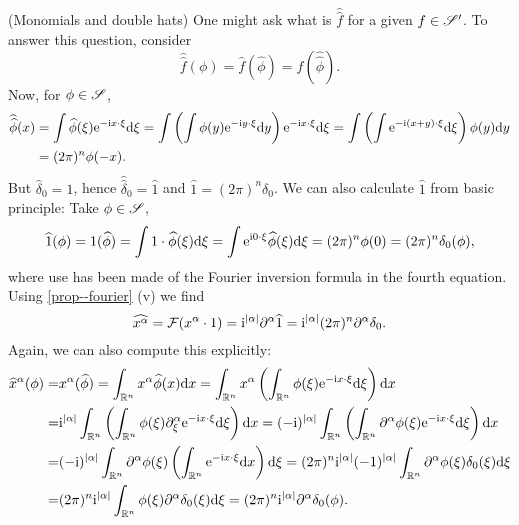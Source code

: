 \documentclass[11pt]{article}
\begin{document}
			\begin{eg}(Monomials and double hats)
				One might ask what is $\hat{\hat{f}}$ for a given $f\in\mathscr{S}^\prime$. To answer this question, consider
				\begin{equation*}
					\hat{\hat{f}}(\phi)=\hat{f}(\hat{\phi})=f(\hat{\hat{\phi}}).
				\end{equation*}
				Now, for $\phi\in\mathscr{S}$,
				\begin{align*}
					\widehat{\widehat{\phi}}(x)&=\int\widehat{\phi}(\xi)\mathrm{e}^{-\mathrm{i} x\cdot\xi}\mathrm{d}\xi=\int\left(\int\phi(y)\mathrm{e}^{-\mathrm{i} y\cdot\xi}\mathrm{d}y\right)\mathrm{e}^{-\mathrm{i} x\cdot\xi}\mathrm{d}\xi=\int\left(\int\mathrm{e}^{-\mathrm{i}(x+y)\cdot\xi}\mathrm{d}\xi\right)\phi(y)\mathrm{d}y\\&=(2\pi)^{n}\phi(-x).
				\end{align*}
				But $\hat{\delta}_0=1$, hence $\hat{\hat{\delta}}_0=\hat{1}$ and $\hat{1}=(2\pi)^n\delta_0$. We can also calculate $\hat{1}$ from basic principle: Take $\phi\in\mathscr{S}$,
				\begin{equation*}
					\widehat{1}(\phi)=1(\widehat{\phi})=\int 1\cdot\widehat{\phi}(\xi)\mathrm{d}\xi=\int\mathrm{e}^{\mathrm{i} 0\cdot\xi}\widehat{\phi}(\xi)\mathrm{d}\xi=(2\pi)^n\phi(0)=(2\pi)^n\delta_0(\phi),
				\end{equation*} 
				where use has been made of the Fourier inversion formula in the fourth equation.
				Using \autoref{prop--fourier} (v) we find
				\begin{equation*}
					\widehat{x^\alpha}=\mathcal{F}(x^\alpha\cdot 1)=\mathrm{i}^{|\alpha|}\partial^\alpha\widehat{1}=\mathrm{i}^{|\alpha|}(2\pi)^{n}\partial^\alpha\delta_0.
				\end{equation*}
				Again, we can also compute this explicitly:
				\begin{align*}
					\widehat{x}^\alpha(\phi)=&x^\alpha(\widehat{\phi})=\int_{\mathbb{R}^n}x^\alpha\widehat{\phi}(x)\mathrm{d}x=\int_{\mathbb{R}^n}x^\alpha\left(\int_{\mathbb{R}^n}\phi(\xi)\mathrm{e}^{-\mathrm{i} x\cdot\xi}\mathrm{d}\xi\right)\mathrm{d}x\\
					=&\mathrm{i}^{|\alpha|}\int_{\mathbb{R}^n}\left(\int_{\mathbb{R}^n}\phi(\xi)\partial^\alpha_\xi\mathrm{e}^{-\mathrm{i} x\cdot\xi}\mathrm{d}\xi\right)\mathrm{d}x=(-\mathrm{i})^{|\alpha|}\int_{\mathbb{R}^n}\left(\int_{\mathbb{R}^n}\partial^\alpha\phi(\xi)\mathrm{e}^{-\mathrm{i} x\cdot\xi}\mathrm{d}\xi\right)\mathrm{d}x\\
					=&(-\mathrm{i})^{|\alpha|}\int_{\mathbb{R}^n}\partial^\alpha\phi(\xi)\left(\int_{\mathbb{R}^n}\mathrm{e}^{-\mathrm{i} x\cdot\xi}\mathrm{d}x\right)\mathrm{d}\xi=(2\pi)^n\mathrm{i}^{|\alpha|}(-1)^{|\alpha|}\int_{\mathbb{R}^n}\partial^\alpha\phi(\xi)\delta_0(\xi)\mathrm{d}\xi\\
					=&(2\pi)^n\mathrm{i}^{|\alpha|}\int_{\mathbb{R}^n}\phi(\xi)\partial^\alpha\delta_0(\xi)\mathrm{d}\xi=(2\pi)^n\mathrm{i}^{|\alpha|}\partial^\alpha\delta_0(\phi).
				\end{align*}
			\end{eg}
\end{document}
